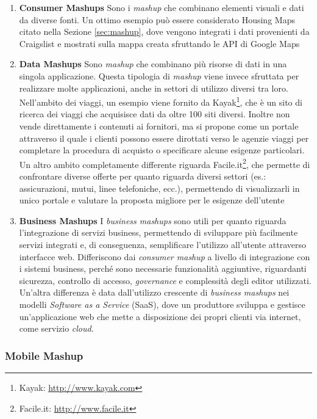 \begin{enumerate}
	\item \textbf{Consumer Mashups}
	Sono i \emph{mashup} che combinano elementi visuali e dati da diverse fonti. Un ottimo esempio può essere considerato Housing Maps citato nella Sezione \ref{sec:mashup}, dove vengono integrati i dati provenienti da Craigslist e mostrati sulla mappa creata sfruttando le API di Google Maps
	\item \textbf{Data Mashups}
	Sono \emph{mashup} che combinano più risorse di dati in una singola applicazione. Questa tipologia di \emph{mashup} viene invece sfruttata per realizzare molte applicazioni, anche in settori di utilizzo diversi tra loro.
	Nell'ambito dei viaggi, un esempio viene fornito da Kayak\footnote{Kayak: \url{http://www.kayak.com}}, che è un sito di ricerca dei viaggi che acquisisce dati da oltre 100 siti diversi. Inoltre non vende direttamente i contenuti ai fornitori, ma si propone come un portale attraverso il quale i clienti possono essere dirottati verso le agenzie viaggi per completare la procedura di acquisto o specificare alcune esigenze particolari.
	Un altro ambito completamente differente riguarda Facile.it\footnote{Facile.it: \url{http://www.facile.it}}, che permette di confrontare diverse offerte per quanto riguarda diversi settori (es.: assicurazioni, mutui, linee telefoniche, ecc.), permettendo di visualizzarli in unico portale e valutare la proposta migliore per le esigenze dell'utente
	\item \textbf{Business Mashups}
	I \emph{business mashups} sono utili per quanto riguarda l'in\-te\-gra\-zio\-ne di servizi business, permettendo di sviluppare più facilmente servizi integrati e, di conseguenza, semplificare l'utilizzo all'utente attraverso interfacce web. Differiscono dai \emph{consumer mashup} a livello di integrazione con i sistemi business, perché sono necessarie funzionalità aggiuntive, riguardanti sicurezza, controllo di accesso, \emph{governance} e complessità degli editor utilizzati. Un'altra differenza è data dall'utilizzo crescente di \emph{business mashups} nei modelli \emph{Software as a Service} (SaaS), dove un produttore sviluppa e gestisce un'applicazione web che mette a disposizione dei propri clienti via internet, come servizio \emph{cloud}.
\end{enumerate}

\subsubsection{Mobile Mashup\label{sec:mobile-mashup}}

